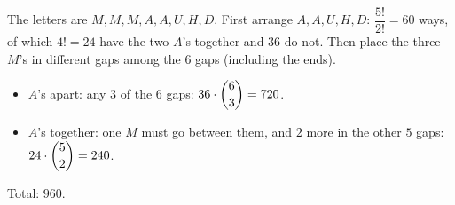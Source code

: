 The letters are $M,M,M,A,A,U,H,D$. First arrange $A,A,U,H,D$: $\dfrac{5!}{2!}=60$ ways, of which $4!=24$ have the two $A$'s together and $36$ do not. Then place the three $M$'s in different gaps among the $6$ gaps (including the ends).
\begin{itemize}
\item $A$'s apart: any $3$ of the $6$ gaps: $36\cdot\dbinom63=720$.
\item $A$'s together: one $M$ must go between them, and $2$ more in the other $5$ gaps: $24\cdot\dbinom52=240$.
\end{itemize}
Total: $\boxed{960}$.
